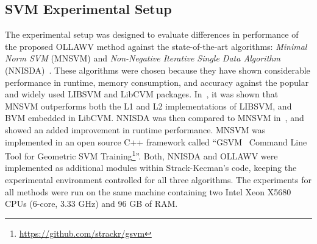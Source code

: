 \documentclass[reqno]{vcuthesis}
\numberwithin{equation}{chapter}
\begin{document}
\subsection{SVM Experimental Setup}\label{subsec:expsvm}
The experimental setup was designed to evaluate differences in performance of the proposed OLLAWV method against the state-of-the-art algorithms: \textit{Minimal Norm SVM} (MNSVM) \cite{strack2013geometric} and \textit{Non-Negative Iterative Single Data Algorithm} (NNISDA)~\cite{zigic2016}. These algorithms were chosen because they have shown considerable performance in runtime, memory consumption, and accuracy against the popular and widely used LIBSVM and LibCVM packages. In~\cite{strack2013geometric}, it was shown that MNSVM outperforms both the L1 and L2 implementations of LIBSVM, and BVM embedded in LibCVM. NNISDA was then compared to MNSVM in~\cite{zigic2016}, and showed an added improvement in runtime performance. MNSVM was implemented in an open source C++ framework called ``GSVM \textendash ~Command Line Tool for Geometric SVM Training\footnote{\url{https://github.com/strackr/gsvm}}''. Both, NNISDA and OLLAWV were implemented as additional modules within Strack-Kecman's code, keeping the experimental environment controlled for all three algorithms. The experiments for all methods were run on the same machine containing two Intel Xeon X5680 CPUs (6-core, 3.33 GHz) and 96 GB of RAM.
\end{document}
